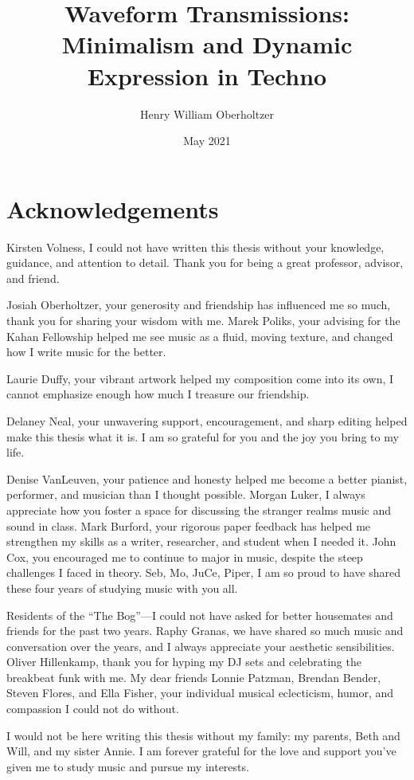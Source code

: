 \documentclass[12pt,twoside]{reedthesis}
\title{Waveform Transmissions: Minimalism and Dynamic Expression in Techno}
\author{Henry William Oberholtzer}
\date{May 2021}
\begin{document}
\maketitle
\frontmatter
\pagestyle{empty}
\chapter*{Acknowledgements}

Kirsten Volness, I could not have written this thesis without your knowledge, guidance, and attention to detail. Thank you for being a great professor, advisor, and friend.

Josiah Oberholtzer, your generosity and friendship has influenced me so much, thank you for sharing your wisdom with me. Marek Poliks, your advising for the Kahan Fellowship helped me see music as a fluid, moving texture, and changed how I write music for the better.

Laurie Duffy, your vibrant artwork helped my composition come into its own, I cannot emphasize enough how much I treasure our friendship.

Delaney Neal, your unwavering support, encouragement, and sharp editing helped make this thesis what it is. I am so grateful for you and the joy you bring to my life.

Denise VanLeuven, your patience and honesty helped me become a better pianist, performer, and musician than I thought possible. Morgan Luker, I always appreciate how you foster a space for discussing the stranger realms music and sound in class. Mark Burford, your rigorous paper feedback has helped me strengthen my skills as a writer, researcher, and student when I needed it. John Cox, you encouraged me to continue to major in music, despite the steep challenges I faced in theory. Seb, Mo, JuCe, Piper, I am so proud to have shared these four years of studying music with you all.

Residents of the ``The Bog''---I could not have asked for better housemates and friends for the past two years. Raphy Granas, we have shared so much music and conversation over the years, and I always appreciate your aesthetic sensibilities. Oliver Hillenkamp, thank you for hyping my DJ sets and celebrating the breakbeat funk with me. My dear friends Lonnie Patzman, Brendan Bender, Steven Flores, and Ella Fisher, your individual musical eclecticism, humor, and compassion I could not do without.

I would not be here writing this thesis without my family: my parents, Beth and Will, and my sister Annie. I am forever grateful for the love and support you've given me to study music and pursue my interests.
\newline
\end{document}
